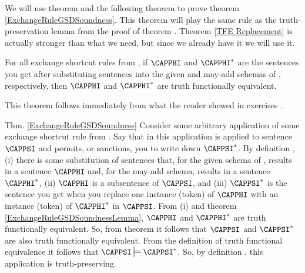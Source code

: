 We will use theorem  and the following theorem to prove theorem \ref{ExchangeRuleGSDSoundness}. This theorem will play the same rule as the truth-preservation lemma from the proof of theorem . Theorem \ref{TFE Replacement} is actually stronger than what we need, but since we already have it we will use it.
\begin{THEOREM}{}
For all exchange shortcut rules  from \GSDP{}, if $\CAPPHI$ and $\CAPPHI^*$ are the sentences you get after substituting \GSL{} sentences into the given and may-add schemas of , respectively, then $\CAPPHI$ and $\CAPPHI^*$ are truth functionally equivalent. 
\end{THEOREM}
\begin{PROOF}
This theorem follows immediately from what the reader showed in exercises . 
\end{PROOF}
\begin{PROOFOF}{Thm. \ref{ExchangeRuleGSDSoundness}}
Consider some arbitrary application of some exchange shortcut rule  from \GSDP{}. 
Say that in this application  is applied to sentence $\CAPPSI$ and permits, or sanctions, you to write down $\CAPPSI^*$. 
By definition , (i) there is some substitution of \GSL{} sentences that, for the given schema of , results in a sentence $\CAPPHI$ and, for the may-add schema, results in a sentence $\CAPPHI^*$, (ii) $\CAPPHI$ is a subsentence of $\CAPPSI$, and (iii) $\CAPPSI^*$ is the \GSL{} sentence you get when you replace one instance (token) of $\CAPPHI$ with an instance (token) of $\CAPPHI^*$ in $\CAPPSI$. 
From (i) and theorem \ref{ExchangeRuleGSDSoundnessLemma}, $\CAPPHI$ and $\CAPPHI^*$ are truth functionally equivalent.
So, from theorem  it follows that $\CAPPSI$ and $\CAPPSI^*$ are also truth functionally equivalent.
From the definition  of truth functional equivalence it follows that $\CAPPSI\sdtstile{}{}\CAPPSI^*$.
So, by definition , this application is truth-preserving. 
\end{PROOFOF}


